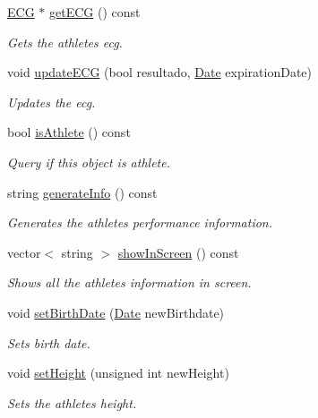 \begin{DoxyCompactItemize}
\hyperlink{class_e_c_g}{E\+CG} $\ast$ \hyperlink{class_athlete_a9655c13ed4126435df2e57e64884deab}{get\+E\+CG} () const
\begin{DoxyCompactList}\small\item\em Gets the athlete\textquotesingle{}s ecg. \end{DoxyCompactList}\item 
void \hyperlink{class_athlete_a7eda9551e23db1e742a33e9ac61bd42d}{update\+E\+CG} (bool resultado, \hyperlink{class_date}{Date} expiration\+Date)
\begin{DoxyCompactList}\small\item\em Updates the ecg. \end{DoxyCompactList}\item 
bool \hyperlink{class_athlete_a5a6f1744e0944cbabbe333964d6357f4}{is\+Athlete} () const
\begin{DoxyCompactList}\small\item\em Query if this object is athlete. \end{DoxyCompactList}\item 
string \hyperlink{class_athlete_a44a5a7f1676c6ad2faca9bf51877a6f8}{generate\+Info} () const
\begin{DoxyCompactList}\small\item\em Generates the athlete\textquotesingle{}s performance information. \end{DoxyCompactList}\item 
vector$<$ string $>$ \hyperlink{class_athlete_a4c7813bb2b52b7095cb7e85aef2e54d5}{show\+In\+Screen} () const
\begin{DoxyCompactList}\small\item\em Shows all the athlete\textquotesingle{}s information in screen. \end{DoxyCompactList}\item 
void \hyperlink{class_athlete_a73fdec76546be945f02cc2b6d90b99ca}{set\+Birth\+Date} (\hyperlink{class_date}{Date} new\+Birthdate)
\begin{DoxyCompactList}\small\item\em Sets birth date. \end{DoxyCompactList}\item 
void \hyperlink{class_athlete_ab96f3138f984bb830aa69f1502961dc8}{set\+Height} (unsigned int new\+Height)
\begin{DoxyCompactList}\small\item\em Sets the athlete\textquotesingle{}s height. \end{DoxyCompactList}\end{DoxyCompactItemize}

